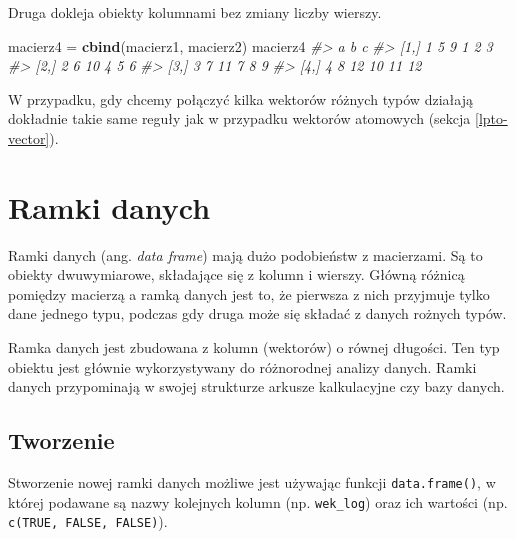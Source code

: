 \documentclass[paper=6in:9in,pagesize=pdftex,headinclude=on,footinclude=on,10pt]{scrbook}
\makeatletter
\newenvironment{Shaded}{\begin{snugshade}}{\end{snugshade}}
\newcommand{\CommentTok}[1]{\textcolor[rgb]{0.56,0.35,0.01}{\textit{#1}}}
\newcommand{\KeywordTok}[1]{\textcolor[rgb]{0.13,0.29,0.53}{\textbf{#1}}}
\newcommand{\NormalTok}[1]{#1}
\newcommand{\StringTok}[1]{\textcolor[rgb]{0.31,0.60,0.02}{#1}}
\newenvironment{kframe}{%
\medskip{}
\setlength{\fboxsep}{.8em}
 \def\at@end@of@kframe{}%
 \ifinner\ifhmode%
  \def\at@end@of@kframe{\end{minipage}}%
  \begin{minipage}{\columnwidth}%
 \fi\fi%
 \def\FrameCommand##1{\hskip\@totalleftmargin \hskip-\fboxsep
 \colorbox{shadecolor}{##1}\hskip-\fboxsep
     \hskip-\linewidth \hskip-\@totalleftmargin \hskip\columnwidth}%
 \MakeFramed {\advance\hsize-\width
   \@totalleftmargin\z@ \linewidth\hsize
   \@setminipage}}%
 {\par\unskip\endMakeFramed%
 \at@end@of@kframe}
\newenvironment{rmdblock}[1]
  {
  \begin{itemize}
  \renewcommand{\labelitemi}{
    \raisebox{-.7\height}[0pt][0pt]{
      {\setkeys{Gin}{width=3em,keepaspectratio}\texttt{[image: images/\#1]}}
    }
  }
  \setlength{\fboxsep}{1em}
  \begin{kframe}
  \item
  }
  {
  \end{kframe}
  \end{itemize}
  }
\newenvironment{rmdinfo}
  {\begin{rmdblock}{compass}}
  {\end{rmdblock}}
\makeatother
\begin{document}
Druga dokleja obiekty kolumnami bez zmiany liczby wierszy.

\begin{Shaded}
\begin{Highlighting}[]
\NormalTok{macierz4 =}\StringTok{ }\KeywordTok{cbind}\NormalTok{(macierz1, macierz2)}
\NormalTok{macierz4}
\CommentTok{#>              a  b  c}
\CommentTok{#> [1,] 1 5  9  1  2  3}
\CommentTok{#> [2,] 2 6 10  4  5  6}
\CommentTok{#> [3,] 3 7 11  7  8  9}
\CommentTok{#> [4,] 4 8 12 10 11 12}
\end{Highlighting}
\end{Shaded}

\begin{rmdinfo}
W przypadku, gdy chcemy połączyć kilka wektorów różnych typów działają dokładnie takie same reguły jak w przypadku wektorów atomowych (sekcja \ref{lpto-vector}).
\end{rmdinfo}

\hypertarget{df}{%
\section{Ramki danych}\label{df}}

Ramki danych (ang. \emph{data frame}) mają dużo podobieństw z macierzami.
Są to obiekty dwuwymiarowe, składające się z kolumn i wierszy.
Główną różnicą pomiędzy macierzą a ramką danych jest to, że pierwsza z nich przyjmuje tylko dane jednego typu, podczas gdy druga może się składać z danych rożnych typów.

Ramka danych jest zbudowana z kolumn (wektorów) o równej długości.
Ten typ obiektu jest głównie wykorzystywany do różnorodnej analizy danych.
Ramki danych przypominają w swojej strukturze arkusze kalkulacyjne czy bazy danych.

\hypertarget{tworzenie-1}{%
\subsection{Tworzenie}\label{tworzenie-1}}

Stworzenie nowej ramki danych możliwe jest używając funkcji \texttt{data.frame()}, w której podawane są nazwy kolejnych kolumn (np. \texttt{wek\_log}) oraz ich wartości (np. \texttt{c(TRUE,\ FALSE,\ FALSE)}).
\end{document}

